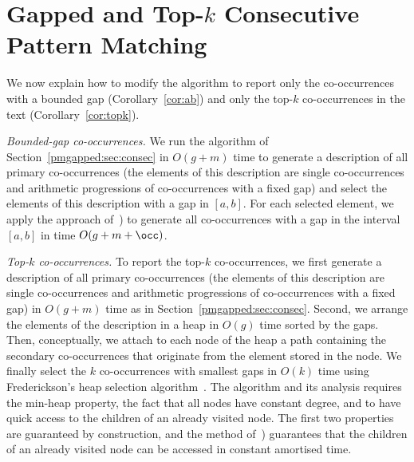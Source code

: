 \section{Gapped and Top-\texorpdfstring{$k$}{k} Consecutive Pattern Matching}
We now explain how to modify the algorithm to report only the co-occurrences with a bounded gap (Corollary~\ref{cor:ab}) and only the top-$k$ co-occurrences in the text (Corollary~\ref{cor:topk}).

\noindent \emph{Bounded-gap co-occurrences.} We run the algorithm of Section~\ref{pmgapped:sec:consec} in $O(g+m)$ time to generate a description of all primary co-occurrences (the elements of this description are single co-occurrences and arithmetic progressions of co-occurrences with a fixed gap) and select the elements of this description with a gap in $[a,b]$. For each selected element, we apply the approach of~\cite[Section 6.4]{talg/ChristiansenEKN21}) to generate all co-occurrences with a gap in the interval $[a,b]$ in time $O(g+m+\occ)$. 

\noindent \emph{Top-$k$ co-occurrences.}
To report the top-$k$ co-occurrences, we first generate a description of all primary co-occurrences (the elements of this description are single co-occurrences and arithmetic progressions of co-occurrences with a fixed gap) in $O(g+m)$ time as in Section~\ref{pmgapped:sec:consec}. Second,  we arrange the elements of the description in a heap in $O(g)$ time sorted by the gaps. Then, conceptually, we attach to each node of the heap a path containing the secondary co-occurrences that originate from the element stored in the node. We finally select the $k$ co-occurrences with smallest gaps in $O(k)$ time using Frederickson's heap selection algorithm~\cite{FREDERICKSON1993197}. The algorithm and its analysis requires the min-heap property, the fact that all nodes have constant degree, and to have quick access to the children of an already visited node. The first two properties are guaranteed by construction, and the method of~\cite[Section 6.4]{talg/ChristiansenEKN21}) guarantees that the children of an already visited node can be accessed in constant amortised time.
